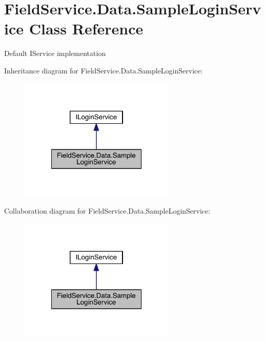 \hypertarget{class_field_service_1_1_data_1_1_sample_login_service}{\section{Field\+Service.\+Data.\+Sample\+Login\+Service Class Reference}
\label{class_field_service_1_1_data_1_1_sample_login_service}
}


Default I\+Service implementation  




Inheritance diagram for Field\+Service.\+Data.\+Sample\+Login\+Service\+:
\nopagebreak
\begin{figure}[H]
\begin{center}
\leavevmode
\includegraphics[width=210pt]{class_field_service_1_1_data_1_1_sample_login_service__inherit__graph}
\end{center}
\end{figure}


Collaboration diagram for Field\+Service.\+Data.\+Sample\+Login\+Service\+:
\nopagebreak
\begin{figure}[H]
\begin{center}
\leavevmode
\includegraphics[width=210pt]{class_field_service_1_1_data_1_1_sample_login_service__coll__graph}
\end{center}
\end{figure}
